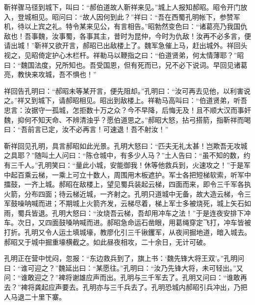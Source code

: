 靳祥骤马径到城下，叫曰：“郝伯道故人靳祥来见。”城上人报知郝昭。昭令开门放入，登城相见。昭问曰：“故人因何到此？”祥曰：“吾在西蜀孔明帐下，参赞军机，待以上宾之礼。特令某来见公，有言相告。”昭勃然变色曰：“诸葛亮乃我国仇敌也！吾事魏，汝事蜀，各事其主，昔时为昆仲，今时为仇敌！汝再不必多言，便请出城！”靳祥又欲开言，郝昭已出敌楼上了。魏军急催上马，赶出城外。祥回头视之，见昭倚定护心木栏杆。祥勒马以鞭指之曰：“伯道贤弟，何太情薄耶？”昭曰：“魏国法度，兄所知也。吾受国恩，但有死而已，兄不必下说词。早回见诸葛亮，教快来攻城，吾不惧也！”

祥回告孔明曰：“郝昭未等某开言，便先阻却。”孔明曰：“汝可再去见他，以利害说之。”祥又到城下，请郝昭相见。昭出到敌楼上。祥勒马高叫曰：“伯道贤弟，听吾忠言：汝据守一孤城，怎拒数十万之众？今不早降，后悔无及！且不顺大汉而事奸魏，抑何不知天命、不辨清浊乎？愿伯道思之。”郝昭大怒，拈弓搭箭，指靳祥而喝曰：“吾前言已定，汝不必再言！可速退！吾不射汝！”

靳祥回见孔明，具言郝昭如此光景。孔明大怒曰：“匹夫无礼太甚！岂欺吾无攻城之具耶？”随叫土人问曰：“陈仓城中，有多少人马？”土人告曰：“虽不知的数，约有三千人。”孔明笑曰：“量此小城，安能御我！休等他救兵到，火速攻之！”于是军中起百乘云梯，一乘上可立十数人，周围用木板遮护。军士各把短梯软索，听军中擂鼓，一齐上城。郝昭在敌楼上，望见蜀兵装起云梯，四面而来，即令三千军各执火箭，分布四面；待云梯近城，一齐射之。孔明只道城中无备，故大造云梯，令三军鼓噪呐喊而进；不期城上火箭齐发，云梯尽着，梯上军士多被烧死，城上矢石如雨，蜀兵皆退。孔明大怒曰：“汝烧吾云梯，吾却用冲车之法！”于是连夜安排下冲车。次日，又四面鼓嗓呐喊而进。郝昭急命运石凿眼，用葛绳穿定飞打，冲车皆被打折。孔明又令人运土填城壕，教廖化引三千锹钁军，从夜间掘地道，暗入城去。郝昭又于城中掘重壕横截之。如此昼夜相攻，二十余日，无计可破。

孔明正在营中忧闷，忽报：“东边救兵到了，旗上书：‘魏先锋大将王双’。”孔明问曰：“谁可迎之？”魏延出曰：“某愿往。”孔明曰：“汝乃先锋大将，未可轻出。”又问：“谁敢迎之？”裨将谢雄应声而出。孔明与三千军去了。孔明又问曰：“谁敢再去？”裨将龚起应声要去。孔明亦与三千兵去了。孔明恐城内郝昭引兵冲出，乃把人马退二十里下寨。

